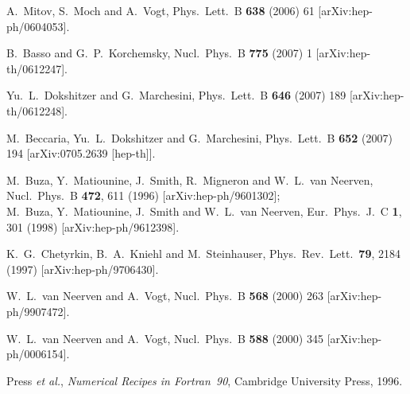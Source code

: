 \documentclass[12pt]{article}
\begin{document}
\begin{thebibliography}{99}
  A.~Mitov, S.~Moch and A.~Vogt,
  Phys.\ Lett.\  B {\bf 638} (2006) 61
  [arXiv:hep-ph/0604053].

  B.~Basso and G.~P.~Korchemsky,
  Nucl.\ Phys.\  B {\bf 775} (2007) 1
  [arXiv:hep-th/0612247].

  Yu.~L.~Dokshitzer and G.~Marchesini,
  Phys.\ Lett.\  B {\bf 646} (2007) 189
  [arXiv:hep-th/0612248].

  M.~Beccaria, Yu.~L.~Dokshitzer and G.~Marchesini,
  Phys.\ Lett.\  B {\bf 652} (2007) 194
  [arXiv:0705.2639 [hep-th]].


  M.~Buza, Y.~Matiounine, J.~Smith, R.~Migneron and W.~L.~van Neerven,
  Nucl.\ Phys.\ B {\bf 472}, 611 (1996)
  [arXiv:hep-ph/9601302];\\
%
  M.~Buza, Y.~Matiounine, J.~Smith and W.~L.~van Neerven,
  Eur.\ Phys.\ J.\ C {\bf 1}, 301 (1998)
  [arXiv:hep-ph/9612398].

  K.~G.~Chetyrkin, B.~A.~Kniehl and M.~Steinhauser,
  Phys.\ Rev.\ Lett.\  {\bf 79}, 2184 (1997)
  [arXiv:hep-ph/9706430].

  W.~L.~van Neerven and A.~Vogt,
  Nucl.\ Phys.\ B {\bf 568} (2000) 263
  [arXiv:hep-ph/9907472].

  W.~L.~van Neerven and A.~Vogt,
  Nucl.\ Phys.\ B {\bf 588} (2000) 345
  [arXiv:hep-ph/0006154].

  Press {\it et al.}, \emph{Numerical Recipes in Fortran~90},
  Cambridge University Press, 1996.
  

\end{thebibliography}
\end{document}
